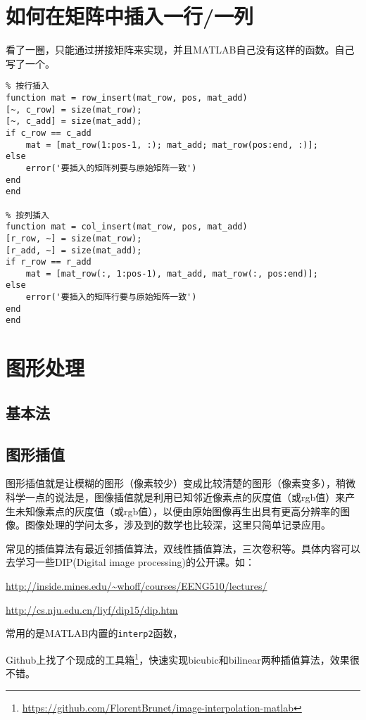 \section{如何在矩阵中插入一行/一列}

看了一圈，只能通过拼接矩阵来实现，并且MATLAB自己没有这样的函数。自己写了一个。

\begin{verbatim}
% 按行插入
function mat = row_insert(mat_row, pos, mat_add)
[~, c_row] = size(mat_row);
[~, c_add] = size(mat_add);
if c_row == c_add
    mat = [mat_row(1:pos-1, :); mat_add; mat_row(pos:end, :)];
else
    error('要插入的矩阵列要与原始矩阵一致')
end
end

% 按列插入
function mat = col_insert(mat_row, pos, mat_add)
[r_row, ~] = size(mat_row);
[r_add, ~] = size(mat_add);
if r_row == r_add
    mat = [mat_row(:, 1:pos-1), mat_add, mat_row(:, pos:end)];
else
    error('要插入的矩阵行要与原始矩阵一致')
end
end
\end{verbatim}

\section{图形处理}

\subsection{基本法}

\subsection{图形插值}

图形插值就是让模糊的图形（像素较少）变成比较清楚的图形（像素变多），稍微科学一点的说法是，图像插值就是利用已知邻近像素点的灰度值（或rgb值）来产生未知像素点的灰度值（或rgb值），以便由原始图像再生出具有更高分辨率的图像。图像处理的学问太多，涉及到的数学也比较深，这里只简单记录应用。

常见的插值算法有最近邻插值算法，双线性插值算法，三次卷积等。具体内容可以去学习一些DIP(Digital image processing)的公开课。如：

\url{http://inside.mines.edu/~whoff/courses/EENG510/lectures/}

\url{http://cs.nju.edu.cn/liyf/dip15/dip.htm}

常用的是MATLAB内置的\texttt{interp2}函数，

Github上找了个现成的工具箱\footnote{\url{https://github.com/FlorentBrunet/image-interpolation-matlab}}，快速实现bicubic和bilinear两种插值算法，效果很不错。



